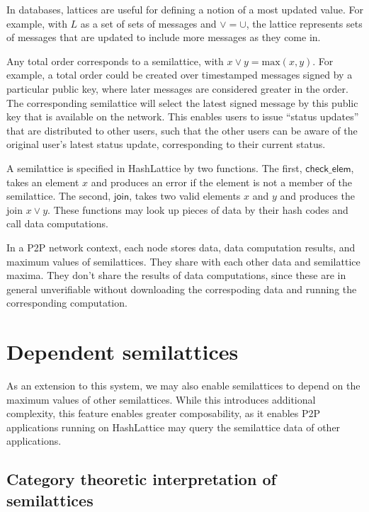 \documentclass{article}
\begin{document}
    In databases, lattices are useful for defining a notion of a most updated value. For example, with $L$ as a set of sets of messages and $\vee = \cup$, the lattice represents sets of messages that are updated to include more messages as they come in.

    Any total order corresponds to a semilattice, with $x \vee y = \mathrm{max}(x, y)$. For example, a total order could be created over timestamped messages signed by a particular public key, where later messages are considered greater in the order. The corresponding semilattice will select the latest signed message by this public key that is available on the network. This enables users to issue ``status updates'' that are distributed to other users, such that the other users can be aware of the original user's latest status update, corresponding to their current status.

    \newcommand{\checkelem}{\ensuremath{\mathsf{check\_elem}}}
    \newcommand{\join}{\ensuremath{\mathsf{join}}}

    A semilattice is specified in HashLattice by two functions. The first, \checkelem, takes an element $x$ and produces an error if the element is not a member of the semilattice. The second, \join, takes two valid elements $x$ and $y$ and produces the join $x \vee y$. These functions may look up pieces of data by their hash codes and call data computations.

    In a P2P network context, each node stores data, data computation results, and maximum values of semilattices. They share with each other data and semilattice maxima. They don't share the results of data computations, since these are in general unverifiable without downloading the correspoding data and running the corresponding computation.

  \section{Dependent semilattices}

    As an extension to this system, we may also enable semilattices to depend on the maximum values of other semilattices. While this introduces additional complexity, this feature enables greater composability, as it enables P2P applications running on HashLattice may query the semilattice data of other applications.

    \subsection{Category theoretic interpretation of semilattices}
\end{document}
